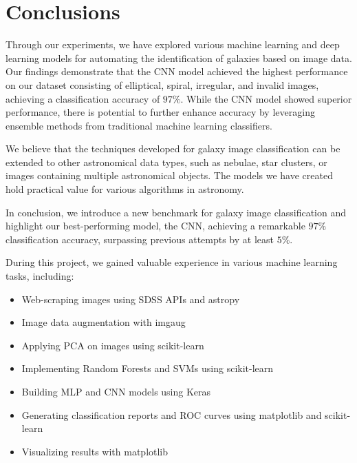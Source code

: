 \section{Conclusions}

Through our experiments, we have explored various machine learning and deep learning models for automating the identification of galaxies based on image data. Our findings demonstrate that the CNN model achieved the highest performance on our dataset consisting of elliptical, spiral, irregular, and invalid images, achieving a classification accuracy of \(97\%\). While the CNN model showed superior performance, there is potential to further enhance accuracy by leveraging ensemble methods from traditional machine learning classifiers.

We believe that the techniques developed for galaxy image classification can be extended to other astronomical data types, such as nebulae, star clusters, or images containing multiple astronomical objects. The models we have created hold practical value for various algorithms in astronomy.

In conclusion, we introduce a new benchmark for galaxy image classification and highlight our best-performing model, the CNN, achieving a remarkable \(97\%\) classification accuracy, surpassing previous attempts by at least \(5\%\).

During this project, we gained valuable experience in various machine learning tasks, including:

\begin{itemize}
    \item Web-scraping images using SDSS APIs and astropy
    \item Image data augmentation with imgaug
    \item Applying PCA on images using scikit-learn
    \item Implementing Random Forests and SVMs using scikit-learn
    \item Building MLP and CNN models using Keras
    \item Generating classification reports and ROC curves using matplotlib and scikit-learn
    \item Visualizing results with matplotlib
\end{itemize}
